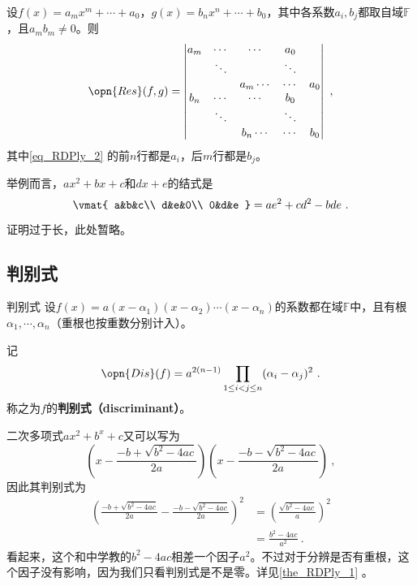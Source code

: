 \begin{theorem}{}\label{the_RDPly_2}
设$f(x)=a_mx^m+\cdots+a_0$，$g(x)=b_nx^n+\cdots+b_0$，其中各系数$a_i, b_j$都取自域$\mathbb{F}$，且$a_mb_m\neq 0$。则
\begin{equation}\label{eq_RDPly_2}
\opn{Res}(f, g)=
\begin{vmatrix}
a_m&\cdots&\cdots&a_0\\
&\ddots& & \ddots\\
&&a_m\cdots&\cdots&a_0\\
b_n&\cdots&\cdots&b_0\\
&\ddots& & \ddots\\
&&b_n\cdots&\cdots&b_0\\
\end{vmatrix}~,
\end{equation}
其中\autoref{eq_RDPly_2} 的前$n$行都是$a_i$，后$m$行都是$b_j$。

举例而言，$ax^2+bx+c$和$dx+e$的结式是
\begin{equation}
\vmat{
    a&b&c\\
    d&e&0\\
    0&d&e
}
=
ae^2+cd^2-bde~.
\end{equation}

\end{theorem}

证明过于长，此处暂略。



\subsection{判别式}

\begin{definition}{判别式}\label{def_RDPly_1}
设$f(x)=a(x-\alpha_1)(x-\alpha_2)\cdots(x-\alpha_n)$的系数都在域$\mathbb{F}$中，且有根$\alpha_1, \cdots, \alpha_n$（重根也按重数分别计入）。

记
\begin{equation}\label{eq_RDPly_3}
\opn{Dis}(f) = a^{2(n-1)}\prod_{1\leq i<j\leq n}(\alpha_i-\alpha_j)^2~.
\end{equation}
称之为$f$的\textbf{判别式（discriminant）}。
\end{definition}

\begin{example}{}
二次多项式$ax^2+b^x+c$又可以写为
\begin{equation}
(x-\frac{-b+\sqrt{b^2-4ac}}{2a})(x-\frac{-b-\sqrt{b^2-4ac}}{2a})~,
\end{equation}
因此其判别式为
\begin{equation}
\begin{aligned}
(\frac{-b+\sqrt{b^2-4ac}}{2a}-\frac{-b-\sqrt{b^2-4ac}}{2a})^2 &= (\frac{\sqrt{b^2-4ac}}{a})^2\\
&=\frac{b^2-4ac}{a^2}~.
\end{aligned}
\end{equation}
看起来，这个和中学教的$b^2-4ac$相差一个因子$a^2$。不过对于分辨是否有重根，这个因子没有影响，因为我们只看判别式是不是零。详见\autoref{the_RDPly_1} 。
\end{example}



